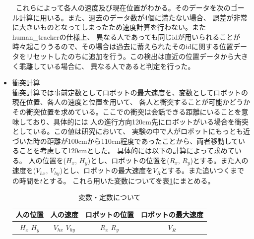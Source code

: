 \documentclass{kuisthesis}
\begin{document}
\begin{itemize}
\ これらによって各人の速度及び現在位置がわかる。そのデータを次のゴール計算に用いる。また、過去のデータ数が4個に満たない場合、
誤差が非常に大きいものとなってしまったため速度計算を行わない。またhuman\_trackerの仕様上、
異なる人であっても同じidが用いられることが時々起こりうるので、その場合は過去に蓄えられたそのidに関する位置データをリセットしたのちに追加を行う。この検出は直近の位置データから大きく乖離している場合に、
異なる人であると判定を行った。
  \item 衝突計算 \\
  衝突計算では事前定数としてロボットの最大速度を、変数としてロボットの現在位置、各人の速度と位置を用いて、
各人と衝突することが可能かどうかその衝突位置を求めている。ここでの衝突は会話できる距離にいることを意味しており、具体的には
人の進行方向120cm先にロボットがいる場合を衝突としている。この値は研究\cite{mumm2011human}において、
実験の中で人がロボットにもっとも近づいた時の距離が100cmから110cm程度であったことから、両者移動していることを考慮して120cmとした。
具体的には以下の計算によって求めている。
人の位置を($H_x$, $H_y$)とし、ロボットの位置を($R_x$, $R_y$)とする。また人の速度を($V_{hx}$, $V_{hy}$)とし、ロボットの最大速度を$V_R$とする。また追いつくまでの時間を$t$とする。
これら用いた変数についてを表\ref{fig: variable}にまとめる。
\begin{table}[H]
  \centering
  \caption{変数・定数について}
  \label{fig: variable}
  \begin{tabular}{|c|c|c|c|}
    \hline
    人の位置 & 人の速度 & ロボットの位置 & ロボットの最大速度 \\ \hline
    $H_x$  $H_y$ & $V_{hx}$  $V_{hy}$ & $R_x$  $R_y$ & $V_R$ \\ \hline
  \end{tabular}
  

\end{table}
\end{itemize}
\end{document}
